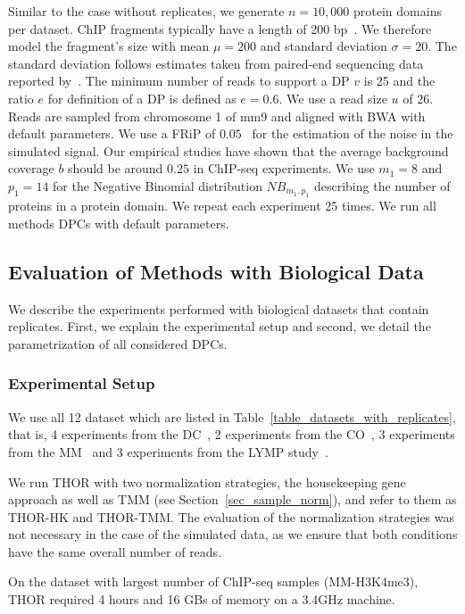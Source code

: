 Similar to the case without replicates, we generate $n=10,000$ protein domains per dataset.
ChIP fragments typically have a length of 200 bp~\citep{Furey2012}.
We therefore model the fragment's size with mean $\mu=200$ and standard deviation $\sigma=20$. 
The standard deviation follows estimates taken from paired-end sequencing data reported by~\cite{Marschall2012}.
The minimum number of reads to support a DP $v$ is 25 and the ratio $e$ for definition of a DP is defined as $e=0.6$.
We use a read size $u$ of $26$.
Reads are sampled from chromosome 1 of mm9 and aligned with BWA with default parameters. 
We use a FRiP of $0.05$~\citep{landt2012} for the estimation of the noise in the simulated signal.
Our empirical studies have shown that the average background coverage $b$ should be around $0.25$ in ChIP-seq experiments.
We use $m_1=8$ and $p_1=14$ for the Negative Binomial distribution $NB_{m_1, p_1}$ describing the number of proteins in a protein domain.
We repeat each experiment 25 times.
We run all methods DPCs with default parameters.
 


\subsection{Evaluation of Methods with Biological Data}
We describe the experiments performed with biological datasets that contain replicates. 
First, we explain the experimental setup and second, we detail the parametrization of all considered DPCs.

\subsubsection{Experimental Setup}
We use all 12 dataset which are listed in Table~\ref{table_datasets_with_replicates}, that is, 4 experiments from the DC~\citep{Lin2015}, 2 experiments from the CO~\citep{Feng2014}, 3 experiments from the MM~\citep{Stunnenberg2014} and 3 experiments from the LYMP study~\citep{Koues2015}.

We run THOR with two normalization strategies, the housekeeping gene approach as well as TMM (see Section~\ref{sec_sample_norm}), and refer to them as THOR-HK and THOR-TMM.
The evaluation of the normalization strategies was not necessary in the case of the simulated data, as we ensure that both conditions have the same overall number of reads.

On the dataset with largest number of ChIP-seq samples (MM-H3K4me3), THOR required 4 hours and 16 GBs of memory on a 3.4GHz machine. 



